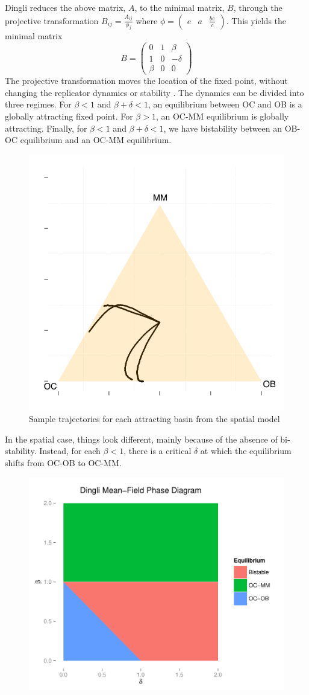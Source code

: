 \documentclass[12pt]{report}
\begin{document}
Dingli reduces the above matrix, $A$, to the minimal matrix, $B$, through the projective transformation $B_{ij} = \frac{A_{ij}}{\phi_j}$ where 
$\phi = {\begin{pmatrix} e & a & \frac{be}{c} \end{pmatrix}}$.
This yields the minimal matrix
$$B = {\begin{pmatrix}
0 & 1 & \beta \\
1 & 0 & -\delta \\
\beta & 0 & 0
\end{pmatrix}}$$
The projective transformation moves the location of the fixed point, without changing the replicator dynamics or stability \cite{Hofbauer1998}. The dynamics can be divided into three regimes. For $\beta < 1$ and $\beta + \delta < 1$, an equilibrium between OC and OB is a globally attracting fixed point. For $\beta > 1$, an OC-MM equilibrium is globally attracting. Finally, for $\beta < 1$ and $\beta + \delta < 1$, we have bistability between an OB-OC equilibrium and an OC-MM equilibrium. 



\begin{figure}[H]
\centering
\includegraphics[width = 0.4 \linewidth]{Diagrams/dingli_trajectories}
\caption{Sample trajectories for each attracting basin from the spatial model}
\end{figure}
In the spatial case, things look different, mainly because of the absence of bi-stability. Instead, for each $\beta < 1$, there is a critical $\delta$ at which the equilibrium shifts from OC-OB to OC-MM.  

\pagebreak


\begin{figure}
\centering
\includegraphics[width = 0.8 \linewidth]{Diagrams/dingli_phase-mf}
\end{figure}
\end{document}
